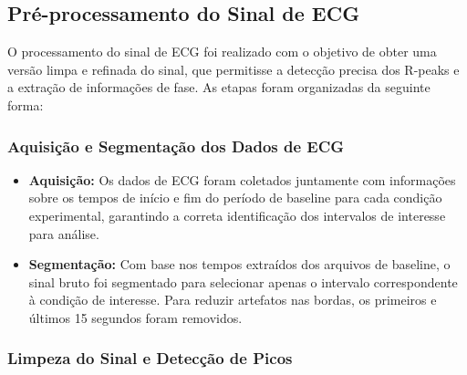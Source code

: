 \subsection{Pré-processamento do Sinal de ECG}
\label{subsec:preprocess_ecg}

O processamento do sinal de ECG foi realizado com o objetivo de obter uma versão limpa e refinada do sinal, que permitisse a detecção precisa dos R-peaks e a extração de informações de fase. As etapas foram organizadas da seguinte forma:

\subsubsection{Aquisição e Segmentação dos Dados de ECG}

\begin{itemize}
    \item \textbf{Aquisição:} Os dados de ECG foram coletados juntamente com informações sobre os tempos de início e fim do período de baseline para cada condição experimental, garantindo a correta identificação dos intervalos de interesse para análise.
    \item \textbf{Segmentação:} Com base nos tempos extraídos dos arquivos de baseline, o sinal bruto foi segmentado para selecionar apenas o intervalo correspondente à condição de interesse. Para reduzir artefatos nas bordas, os primeiros e últimos 15 segundos foram removidos.
\end{itemize}

\subsubsection{Limpeza do Sinal e Detecção de Picos}

